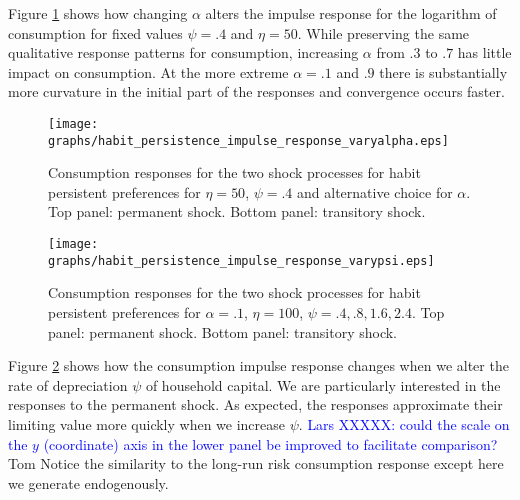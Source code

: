 \documentclass[12pt]{article}
\begin{document}
\noindent Figure \ref{fig:alpha_responses} shows how changing $\alpha$ alters the impulse response for the logarithm of consumption for fixed values
$\psi = .4$ and $\eta  = 50$.  While preserving the same qualitative response patterns for consumption, increasing $\alpha$ from $.3$ to $.7$ has little impact on consumption.  At the more extreme $\alpha = .1$ and $.9$ there is substantially more curvature in the initial part of the responses and convergence occurs faster.

\begin{figure}[H]
\texttt{[image: graphs/habit\_persistence\_impulse\_response\_varyalpha.eps]}
\caption{Consumption responses for the two shock processes for habit persistent preferences for $\eta =  50$, $\psi = .4$ and alternative choice for $\alpha$. Top panel: permanent shock.  Bottom panel: transitory shock.   }\label{fig:alpha_responses}
\end{figure}

\begin{figure}[H]
\texttt{[image: graphs/habit\_persistence\_impulse\_response\_varypsi.eps]}
\caption{Consumption responses for the two shock processes for habit persistent preferences for $\alpha = .1$, $\eta =  100$, $\psi = .4, .8,1.6, 2.4$. Top panel: permanent shock.  Bottom panel: transitory shock.  }\label{fig:psi_responses}
\end{figure}

Figure \ref{fig:psi_responses} shows how the consumption impulse response changes when we alter the rate of depreciation  $\psi$ of  household capital. We are particularly interested in the responses to the permanent shock.  As expected,  the responses approximate their limiting value more quickly when we increase $\psi$.  \textcolor{blue}{Lars XXXXX:  could the scale on the $y$ (coordinate) axis in the lower panel be improved to facilitate comparison?} {\color{red} Tom Notice the similarity to the long-run risk consumption response except here we generate endogenously.}
\end{document}
